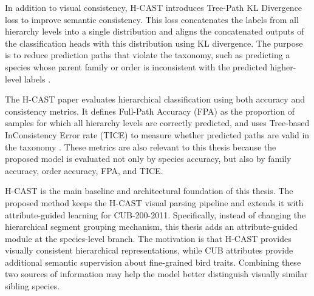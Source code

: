 In addition to visual consistency, H-CAST introduces Tree-Path KL Divergence loss to improve semantic consistency. This loss concatenates the labels from all hierarchy levels into a single distribution and aligns the concatenated outputs of the classification heads with this distribution using KL divergence. The purpose is to reduce prediction paths that violate the taxonomy, such as predicting a species whose parent family or order is inconsistent with the predicted higher-level labels \cite{park2025visually}.

The H-CAST paper evaluates hierarchical classification using both accuracy and consistency metrics. It defines Full-Path Accuracy (FPA) as the proportion of samples for which all hierarchy levels are correctly predicted, and uses Tree-based InConsistency Error rate (TICE) to measure whether predicted paths are valid in the taxonomy \cite{park2025visually}. These metrics are also relevant to this thesis because the proposed model is evaluated not only by species accuracy, but also by family accuracy, order accuracy, FPA, and TICE.

H-CAST is the main baseline and architectural foundation of this thesis. The proposed method keeps the H-CAST visual parsing pipeline and extends it with attribute-guided learning for CUB-200-2011. Specifically, instead of changing the hierarchical segment grouping mechanism, this thesis adds an attribute-guided module at the species-level branch. The motivation is that H-CAST provides visually consistent hierarchical representations, while CUB attributes provide additional semantic supervision about fine-grained bird traits. Combining these two sources of information may help the model better distinguish visually similar sibling species.